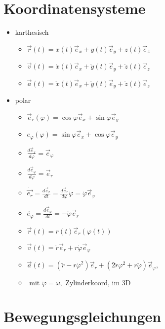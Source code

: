 \documentclass[fleqn,twoside]{article}
\begin{document}
\begin{multicols*}{3}



\section{Koordinatensysteme}
    \begin{itemize}
    \item karthesisch
        \begin{itemize}
            \item $\vec{r}(t)  =x(t) \vec{e}_x+y(t) \vec{e}_y+z(t) \vec{e}_z$
            \item $\vec{v}(t)  =\dot{x}(t) \vec{e}_x+\dot{y}(t) \vec{e}_y+\dot{z}(t) \vec{e}_z$
            \item $\vec{a}(t)  =\ddot{x}(t) \vec{e}_x+\ddot{y}(t) \vec{e}_y+\ddot{z}(t) \vec{e}_z$
        \end{itemize}
    \item polar
        \begin{itemize}
         \item $\vec{e}_r(\varphi)=\cos \varphi \vec{e}_x+\sin \varphi \vec{e}_y $
        \item $ e_{\varphi}(\varphi)=\sin \varphi \vec{e}_x+\cos \varphi \vec{e}_y$
        \item $\frac{d \vec{e}_x}{d \varphi}=\vec{e}_{\varphi}$
        \item $\frac{d \vec{e}_{\varphi}}{d \varphi}=\vec{e}_r$
        \item $\dot{\overrightarrow{e_r}}=\frac{d \vec{e}_r}{d t}=\frac{d \vec{e}_r}{d \varphi} \dot{\varphi}=\dot{\varphi} \vec{e}_{\varphi}$
        \item $\dot{e_{\varphi}}=\frac{d \vec{e}_{\varphi}}{d t}=-\dot{\varphi} \vec{e}_r$
        \item $\vec{r}(t)=r(t) \vec{e}_r(\varphi(t))$
        \item $\vec{v}(t)=\dot{r} \vec{e}_r+r \dot{\varphi} \vec{e}_{\varphi}$
        \item $\vec{a}(t)=\left(\ddot{r}-r \dot{\varphi}^2\right) \vec{e}_r+\left(2 \dot{r} \varphi^2+r \ddot{\varphi}\right) \vec{e}_{\varphi},$
        \item $ \text { mit } \dot{\varphi}=\omega, \text { Zylinderkoord, im 3D }$
      \end{itemize}\end{itemize}
\section{Bewegungsgleichungen}

\end{multicols*}
\end{document}
